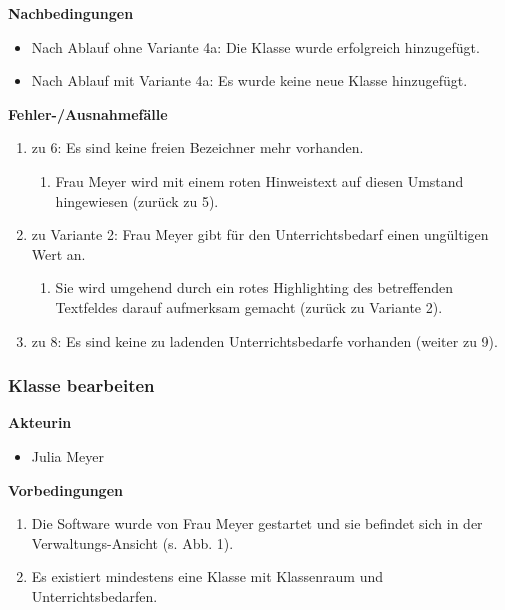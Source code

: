 \documentclass[fontsize=12pt,paper=a4,twoside]{scrartcl}
\begin{document}
\textbf{Nachbedingungen}
\begin{itemize}
\item Nach Ablauf ohne Variante 4a: Die Klasse wurde erfolgreich hinzugefügt.
\item Nach Ablauf mit Variante 4a: Es wurde keine neue Klasse hinzugefügt.
\end{itemize}
\vspace{5pt}


\textbf{Fehler-/Ausnahmefälle}
\begin{enumerate}
\item zu 6: Es sind keine freien Bezeichner mehr vorhanden. 
	\begin{enumerate}[label={\arabic*.}]
	\item Frau Meyer wird mit einem roten Hinweistext auf diesen Umstand hingewiesen (zurück zu 5).
	\end{enumerate}
\item zu Variante 2: Frau Meyer gibt für den Unterrichtsbedarf einen ungültigen Wert an.
		\begin{enumerate}[label={\arabic*.}]
		\item Sie wird umgehend durch ein rotes Highlighting des betreffenden Textfeldes darauf aufmerksam gemacht (zurück zu Variante 2).
		\end{enumerate}
\item zu 8: Es sind keine zu ladenden Unterrichtsbedarfe vorhanden (weiter zu 9).

\end{enumerate}


\subsubsection{Klasse bearbeiten}
\label{subsubsec:KlasseBearbeiten}

\textbf{Akteurin}
\begin{itemize}
\item Julia Meyer
\end{itemize}
\vspace{5pt}


\textbf{Vorbedingungen}
\begin{enumerate}
\item Die Software wurde von Frau Meyer gestartet und sie befindet sich in der Verwaltungs-Ansicht (s. Abb. 1).
\item Es existiert mindestens eine Klasse mit Klassenraum und Unterrichtsbedarfen.
\end{enumerate}
\vspace{5pt}
\end{document}
